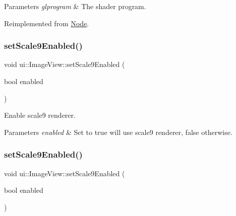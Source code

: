 \begin{DoxyParams}{Parameters}
{\em glprogram} & The shader program. \\
\hline
\end{DoxyParams}


Reimplemented from \hyperlink{classNode_a16ac830f1b38ae931da062c0833b2db0}{Node}.

\mbox{\label{classui_1_1ImageView_a0bb86e839e826007cc92f362c0ae3794}} 
\subsubsection{\texorpdfstring{set\+Scale9\+Enabled()}{setScale9Enabled()}\hspace{0.1cm}{\footnotesize\ttfamily [1/2]}}
{\footnotesize\ttfamily void ui\+::\+Image\+View\+::set\+Scale9\+Enabled (\begin{DoxyParamCaption}\item[{bool}]{enabled }\end{DoxyParamCaption})}

Enable scale9 renderer.


\begin{DoxyParams}{Parameters}
{\em enabled} & Set to true will use scale9 renderer, false otherwise. \\
\hline
\end{DoxyParams}
\mbox{\label{classui_1_1ImageView_a0bb86e839e826007cc92f362c0ae3794}} 
\subsubsection{\texorpdfstring{set\+Scale9\+Enabled()}{setScale9Enabled()}\hspace{0.1cm}{\footnotesize\ttfamily [2/2]}}
{\footnotesize\ttfamily void ui\+::\+Image\+View\+::set\+Scale9\+Enabled (\begin{DoxyParamCaption}\item[{bool}]{enabled }\end{DoxyParamCaption})}

